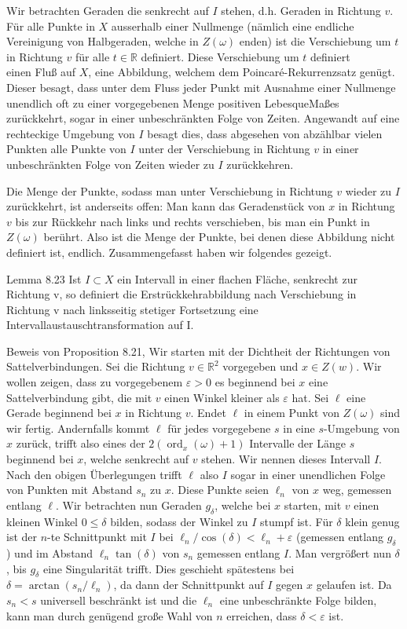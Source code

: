 \documentclass[10pt, letterpaper]{article}
\begin{document}
Wir betrachten Geraden die senkrecht auf $I$ stehen, d.h. Geraden in Richtung $v$. Für alle Punkte in $X$ ausserhalb einer Nullmenge (nämlich eine endliche Vereinigung von Halbgeraden, welche in $Z(\omega)$ enden) ist die Verschiebung um $t$ in Richtung $v$ für alle $t \in \mathbb{R}$ definiert. Diese Verschiebung um $t$ definiert\\
einen Fluß auf $X$, eine Abbildung, welchem dem Poincaré-Rekurrenzsatz genügt. Dieser besagt, dass unter dem Fluss jeder Punkt mit Ausnahme einer Nullmenge unendlich oft zu einer vorgegebenen Menge positiven LebesqueMaßes zurückkehrt, sogar in einer unbeschränkten Folge von Zeiten. Angewandt auf eine rechteckige Umgebung von $I$ besagt dies, dass abgesehen von abzählbar vielen Punkten alle Punkte von $I$ unter der Verschiebung in Richtung $v$ in einer unbeschränkten Folge von Zeiten wieder zu $I$ zurückkehren.

Die Menge der Punkte, sodass man unter Verschiebung in Richtung $v$ wieder zu $I$ zurückkehrt, ist anderseits offen: Man kann das Geradenstück von $x$ in Richtung $v$ bis zur Rückkehr nach links und rechts verschieben, bis man ein Punkt in $Z(\omega)$ berührt. Also ist die Menge der Punkte, bei denen diese Abbildung nicht definiert ist, endlich. Zusammengefasst haben wir folgendes gezeigt.

Lemma 8.23 Ist $I \subset X$ ein Intervall in einer flachen Fläche, senkrecht zur Richtung v, so definiert die Erstrückkehrabbildung nach Verschiebung in Richtung v nach linksseitig stetiger Fortsetzung eine Intervallaustauschtransformation auf I.

Beweis von Proposition 8.21, Wir starten mit der Dichtheit der Richtungen von Sattelverbindungen. Sei die Richtung $v \in \mathbb{R}^{2}$ vorgegeben und $x \in Z(w)$. Wir wollen zeigen, dass zu vorgegebenem $\varepsilon>0$ es beginnend bei $x$ eine Sattelverbindung gibt, die mit $v$ einen Winkel kleiner als $\varepsilon$ hat. Sei $\ell$ eine Gerade beginnend bei $x$ in Richtung $v$. Endet $\ell$ in einem Punkt von $Z(\omega)$ sind wir fertig. Andernfalls kommt $\ell$ für jedes vorgegebene $s$ in eine $s$-Umgebung von $x$ zurück, trifft also eines der $2\left(\operatorname{ord}_{x}(\omega)+1\right)$ Intervalle der Länge $s$ beginnend bei $x$, welche senkrecht auf $v$ stehen. Wir nennen dieses Intervall $I$. Nach den obigen Überlegungen trifft $\ell$ also $I$ sogar in einer unendlichen Folge von Punkten mit Abstand $s_{n}$ zu $x$. Diese Punkte seien $\ell_{n}$ von $x$ weg, gemessen entlang $\ell$. Wir betrachten nun Geraden $g_{\delta}$, welche bei $x$ starten, mit $v$ einen kleinen Winkel $0 \leq \delta$ bilden, sodass der Winkel zu $I$ stumpf ist. Für $\delta$ klein genug ist der $n$-te Schnittpunkt mit $I$ bei $\ell_{n} / \cos (\delta)<\ell_{n}+\varepsilon$ (gemessen entlang $g_{\delta}$ ) und im Abstand $\ell_{n} \tan (\delta)$ von $s_{n}$ gemessen entlang $I$. Man vergrößert nun $\delta$, bis $g_{\delta}$ eine Singularität trifft. Dies geschieht spätestens bei $\delta=\arctan \left(s_{n} / \ell_{n}\right)$, da dann der Schnittpunkt auf $I$ gegen $x$ gelaufen ist. Da $s_{n}<s$ universell beschränkt ist und die $\ell_{n}$ eine unbeschränkte Folge bilden, kann man durch genügend große Wahl von $n$ erreichen, dass $\delta<\varepsilon$ ist.
\end{document}
